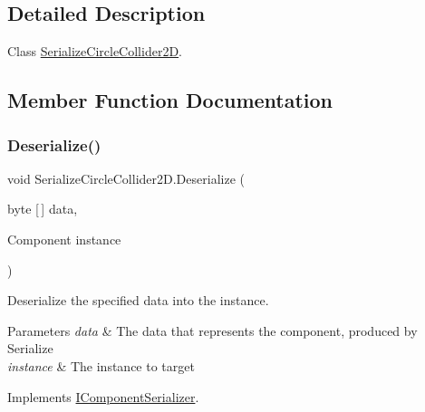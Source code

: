 \subsection{Detailed Description}
Class \hyperlink{class_serialize_circle_collider2_d}{Serialize\+Circle\+Collider2D}. 



\subsection{Member Function Documentation}
\mbox{\label{class_serialize_circle_collider2_d_ae96fe731156dd3dad5f854f9fcb7ac19}} 
\subsubsection{\texorpdfstring{Deserialize()}{Deserialize()}}
{\footnotesize\ttfamily void Serialize\+Circle\+Collider2\+D.\+Deserialize (\begin{DoxyParamCaption}\item[{byte \mbox{[}$\,$\mbox{]}}]{data,  }\item[{Component}]{instance }\end{DoxyParamCaption})\hspace{0.3cm}{\ttfamily [inline]}}



Deserialize the specified data into the instance. 


\begin{DoxyParams}{Parameters}
{\em data} & The data that represents the component, produced by Serialize\\
\hline
{\em instance} & The instance to target\\
\hline
\end{DoxyParams}


Implements \hyperlink{interface_i_component_serializer_a4cc366a5c78b33d47a90c209d8fed883}{I\+Component\+Serializer}.

\mbox{\label{class_serialize_circle_collider2_d_afc9c9861ba6c6c9949d56c851dd095fa}} 
